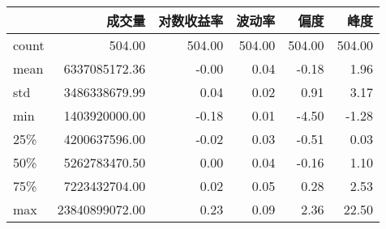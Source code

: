 \begin{tabular}{lrrrrr}
\toprule
{} &            成交量 &  对数收益率 &    波动率 &     偏度 &     峰度 \\
\midrule
count &         504.00 & 504.00 & 504.00 & 504.00 & 504.00 \\
mean  &  6337085172.36 &  -0.00 &   0.04 &  -0.18 &   1.96 \\
std   &  3486338679.99 &   0.04 &   0.02 &   0.91 &   3.17 \\
min   &  1403920000.00 &  -0.18 &   0.01 &  -4.50 &  -1.28 \\
25\%   &  4200637596.00 &  -0.02 &   0.03 &  -0.51 &   0.03 \\
50\%   &  5262783470.50 &   0.00 &   0.04 &  -0.16 &   1.10 \\
75\%   &  7223432704.00 &   0.02 &   0.05 &   0.28 &   2.53 \\
max   & 23840899072.00 &   0.23 &   0.09 &   2.36 &  22.50 \\
\bottomrule
\end{tabular}
